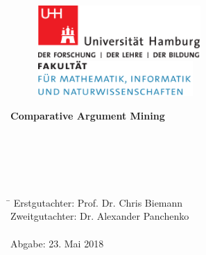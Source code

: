 \begin{titlepage}

  \setcounter{page}{-1}

	\begin{figure}[h]
		\begin{minipage}[b]{62mm}
			\includegraphics[width=62mm]{images/unilogo}
		\end{minipage}
		\hspace{4cm}
		\begin{minipage}[b]{59mm}
			\includegraphics[width=59mm]{images/minlogo}
		\end{minipage}
	\end{figure}

	\vfill
	
	\begin{center}
		\vspace{14mm}
		\noindent \textbf{\huge
		  Comparative Argument Mining
		}
		\vspace{60mm}	
	\end{center}
	
	\vfill
	
	 \\
	 \\
	 \\
	 \\
	\begin{tabbing}
	\hspace{8em} \=  \kill
	Erstgutachter: \> Prof. Dr. Chris Biemann \\
	Zweitgutachter: \> Dr. Alexander Panchenko \\
	~ \\
	Abgabe: 23. Mai 2018
	\end{tabbing}
	
	\newpage 
	\thispagestyle{empty}
	\setcounter{page}{0}

	
\end{titlepage}

